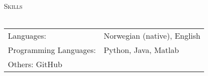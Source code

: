 \documentclass[a4paper]{article}
\newcommand{\lineunder} {
    \vspace*{-8pt} \\
    \hspace*{-18pt} \hrulefill \\
}
\newcommand{\header} [1] {
    {\hspace*{-18pt}\vspace*{6pt} \textsc{#1}}
    \vspace*{-6pt} \lineunder
}
\begin{document}
\header{Skills}
\begin{tabular}{ l l }
	Languages:             & Norwegian (native), English \\                                       
	Programming Languages: & Python, Java, Matlab                            \\
    Others: GitHub
\end{tabular}
\vspace{2mm}
\end{document}
